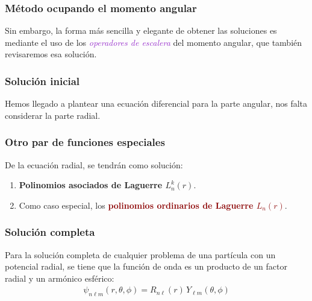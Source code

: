 \documentclass[12pt]{beamer}
\begin{document}
\begin{frame}
\frametitle{Método ocupando el momento angular}
Sin embargo, \pause la forma más sencilla y elegante de obtener las soluciones es mediante el uso de los \emph{\textcolor{darkorchid}{operadores de escalera}} del momento angular, que también revisaremos esa solución.
\end{frame}
\begin{frame}
\frametitle{Solución inicial}
Hemos llegado a plantear una ecuación diferencial para la parte angular, \pause nos falta considerar la parte radial.
\end{frame}
\begin{frame}
\frametitle{Otro par de funciones especiales}
De  la ecuación radial, se tendrán como solución:
\begin{enumerate}[<+->]
\item \textbf{\textcolor{bole}{Polinomios asociados de Laguerre $L_{n}^{k} (r)$}}.
\item Como caso especial, los \textbf{\textcolor{darkred}{polinomios ordinarios de Laguerre $L_{n} (r)$}}.
\end{enumerate}
\end{frame}
\begin{frame}
\frametitle{Solución completa}
Para la solución completa de cualquier problema de una partícula con un potencial radial, se tiene que la función de onda es un producto de un factor radial y un armónico esférico:
\pause
\begin{align*}
\psi_{n \ell m} (r, \theta, \phi) = R_{n \ell} (r) \, Y_{\ell m} (\theta, \phi)
\end{align*}
\end{frame}
\end{document}
